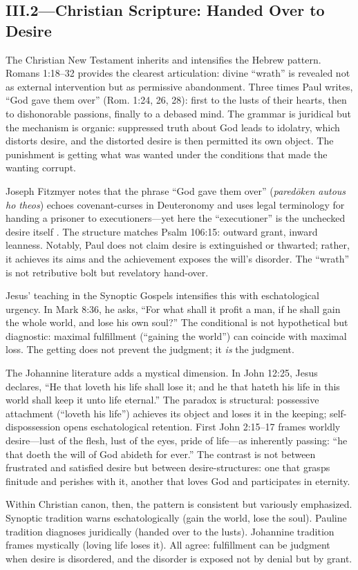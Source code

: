 \subsection*{III.2—Christian Scripture: Handed Over to Desire}
\label{ssec:iii-christian-scripture}

The Christian New Testament inherits and intensifies the Hebrew pattern. Romans 1:18--32
provides
the clearest articulation: divine ``wrath'' is revealed not as external intervention but as
permissive abandonment. Three times Paul writes, ``God gave them over'' (Rom. 1:24, 26, 28):
first to the lusts of their hearts, then to dishonorable passions, finally to a debased mind.
The grammar is juridical but the mechanism is organic: suppressed truth about God leads to
idolatry, which distorts desire, and the distorted desire is then permitted its own object.
The punishment is getting what was wanted under the conditions that made the wanting corrupt.

Joseph Fitzmyer notes that the phrase ``God gave them over'' (\emph{paredōken autous ho theos})
echoes covenant-curses in Deuteronomy and uses legal terminology for handing a prisoner to
executioners---yet here the ``executioner'' is the unchecked desire itself
\parencite[p.~280]{FitzmyerRomans1993}. The structure matches Psalm 106:15: outward grant,
inward leanness. Notably, Paul does not claim desire is extinguished or thwarted; rather, it
achieves its aims and the achievement exposes the will's disorder. The ``wrath'' is not
retributive bolt but revelatory hand-over.

Jesus' teaching in the Synoptic Gospels intensifies this with eschatological urgency. In Mark
8:36, he asks, ``For what shall it profit a man, if he shall gain the whole world, and lose
his own soul?'' The conditional is not hypothetical but diagnostic: maximal fulfillment
(``gaining the world'') can coincide with maximal loss. The getting does not prevent the
judgment; it \emph{is} the judgment.

The Johannine literature adds a mystical dimension. In John 12:25, Jesus declares, ``He that
loveth his life shall lose it; and he that hateth his life in this world shall keep it unto
life eternal.'' The paradox is structural: possessive attachment (``loveth his life'')
achieves its object and loses it in the keeping; self-dispossession opens eschatological
retention. First John 2:15--17 frames worldly desire---lust of the flesh, lust of the eyes,
pride of life---as inherently passing: ``he that doeth the will of God abideth for ever.''
The contrast is not between frustrated and satisfied desire but between desire-structures:
one that grasps
finitude and perishes with it, another that loves God and participates in eternity.

Within Christian canon, then, the pattern is consistent but variously emphasized. Synoptic
tradition warns eschatologically (gain the world, lose the soul). Pauline tradition diagnoses
juridically (handed over to the lusts). Johannine tradition frames mystically (loving life
loses it). All agree: fulfillment can be judgment when desire is disordered, and the disorder
is exposed not by denial but by grant.
